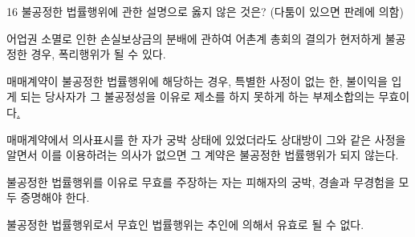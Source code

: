 \begin{question}{16}
불공정한 법률행위에 관한 설명으로 옳지 않은 것은? (다툼이 있으면 판례에 의함)
\begin{choices}
  \item 어업권 소멸로 인한 손실보상금의 분배에 관하여 어촌계 총회의 결의가 현저하게 불공정한 경우, 폭리행위가 될 수 있다.
  \item 매매계약이 불공정한 법률행위에 해당하는 경우, 특별한 사정이 없는 한, 불이익을 입게 되는 당사자가 그 불공정성을 이유로 제소를 하지 못하게 하는 부제소합의는 무효이다\uline{.}
  \item 매매계약에서 의사표시를 한 자가 궁박 상태에 있었더라도 상대방이 그와 같은 사정을 알면서 이를 이용하려는 의사가 없으면 그 계약은 불공정한 법률행위가 되지 않는다.
  \item 불공정한 법률행위를 이유로 무효를 주장하는 자는 피해자의 궁박, 경솔과 무경험을 모두 증명해야 한다.
  \item 불공정한 법률행위로서 무효인 법률행위는 추인에 의해서 유효로 될 수 없다.
\end{choices}
\end{question}
